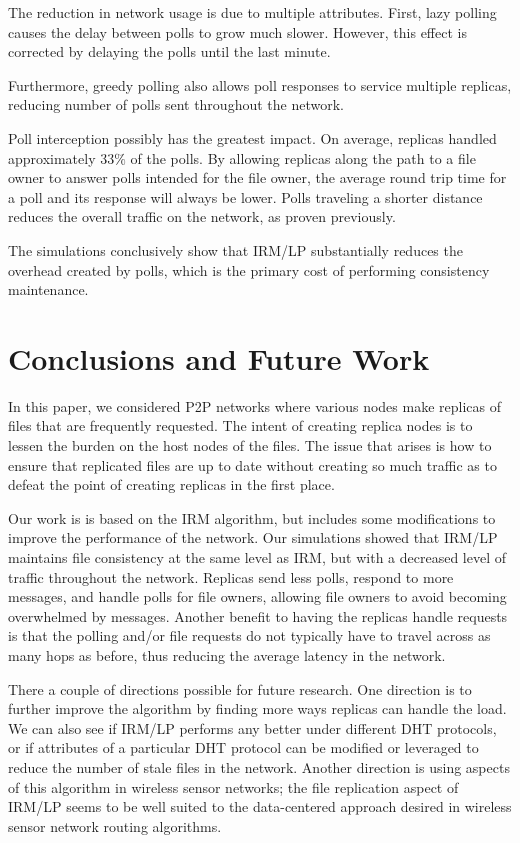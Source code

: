\documentclass[10pt, conference, compsocconf, letterpaper]{IEEEtran} %
\begin{document}
The reduction in network usage is due to multiple attributes.  First, lazy polling causes the delay between polls to grow much slower.  However, this effect is corrected by delaying the polls until the last minute.  

Furthermore, greedy polling also allows poll responses to service multiple replicas, reducing number of polls sent throughout the network.

Poll interception possibly has the greatest impact. On average, replicas handled approximately $33\%$ of the polls.  By allowing replicas along the path to a file owner to answer polls intended for the file owner, the average round trip time for a poll and its response will always be lower.  Polls traveling a shorter distance reduces the overall traffic on the network, as proven previously.


The simulations conclusively show that IRM/LP substantially reduces the overhead created by polls, which is the primary cost of performing consistency maintenance.






\section{Conclusions and Future Work}
In this paper, we considered P2P networks where various nodes make replicas
of files that are frequently requested. The intent of creating replica nodes
is to lessen the burden on the host nodes of the files. The issue that arises is how to ensure that replicated files are up to date without creating so much traffic as to defeat the point of creating replicas in the first place.

Our work is is based on the IRM algorithm, but includes some modifications to improve the performance of the network. Our simulations showed that IRM/LP maintains file consistency at the same level as IRM, but with a decreased level of traffic throughout the network. Replicas send less polls, respond to more messages, and handle polls for file owners, allowing  file owners to avoid becoming overwhelmed by messages. Another benefit to having the replicas handle requests is that the polling and/or file requests do not typically have to travel across as many hops as before, thus reducing the average latency in the network.

There a couple of directions possible for future research. One direction is to further improve the algorithm by finding more ways replicas can handle the load. We can also see if IRM/LP performs any better under different DHT protocols, or if attributes of a particular DHT protocol can be modified or leveraged to reduce the number of stale files in the network. Another direction is using aspects of this algorithm in wireless sensor networks; the file replication aspect of IRM/LP seems to be well suited to the data-centered approach desired in wireless sensor network routing algorithms.  
\end{document}
